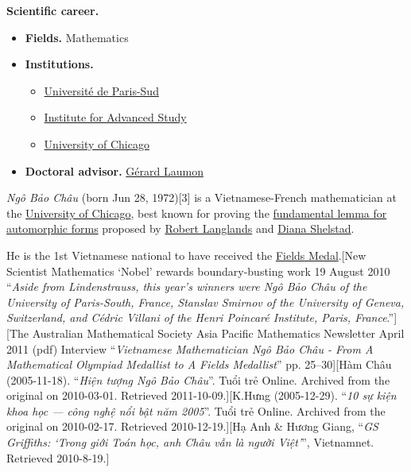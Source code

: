 \documentclass{book}
\numberwithin{equation}{section}
\begin{document}
\textbf{Scientific career.}
\begin{itemize}
    \item \textbf{Fields.} Mathematics
    \item \textbf{Institutions.}
    \begin{itemize}
        \item \href{https://en.wikipedia.org/wiki/Universit%C3%A9_de_Paris-Sud}{Universit\'e de Paris-Sud}
        \item \href{https://en.wikipedia.org/wiki/Institute_for_Advanced_Study}{Institute for Advanced Study}
        \item \href{https://en.wikipedia.org/wiki/University_of_Chicago}{University of Chicago}
    \end{itemize}
    \item \textbf{Doctoral advisor.} \href{https://en.wikipedia.org/wiki/G%C3%A9rard_Laumon}{G\'erard Laumon}
\end{itemize}
\textit{Ngô Bảo Châu} (born Jun 28, 1972)[3] is a Vietnamese-French mathematician at the \href{https://en.wikipedia.org/wiki/University_of_Chicago}{University of Chicago}, best known for proving the \href{https://en.wikipedia.org/wiki/Fundamental_lemma_(Langlands_program)}{fundamental lemma for automorphic forms} proposed by \href{https://en.wikipedia.org/wiki/Robert_Langlands}{Robert Langlands} and \href{https://en.wikipedia.org/wiki/Diana_Shelstad}{Diana Shelstad}.

He is the 1st Vietnamese national to have received the \href{https://en.wikipedia.org/wiki/Fields_Medal}{Fields Medal}.[New Scientist Mathematics `Nobel' rewards boundary-busting work 19 August 2010 ``\textit{Aside from Lindenstrauss, this year's winners were Ngô Bảo Châu of the University of Paris-South, France, Stanslav Smirnov of the University of Geneva, Switzerland, and Cédric Villani of the Henri Poincaré Institute, Paris, France}.''][The Australian Mathematical Society Asia Pacific Mathematics Newsletter April 2011 (pdf) Interview ``\textit{Vietnamese Mathematician Ngô Bảo Châu - From A Mathematical Olympiad Medallist to A Fields Medallist}'' pp. 25--30][Hàm Châu (2005-11-18). ``\textit{Hiện tượng Ngô Bảo Châu}''. Tuổi trẻ Online. Archived from the original on 2010-03-01. Retrieved 2011-10-09.][K.Hưng (2005-12-29). ``\textit{10 sự kiện khoa học — công nghệ nổi bật năm 2005}''. Tuổi trẻ Online. Archived from the original on 2010-02-17. Retrieved 2010-12-19.][Hạ Anh \& Hương Giang, ``\textit{GS Griffiths: `Trong giới Toán học, anh Châu vẫn là người Việt'}'', Vietnamnet. Retrieved 2010-8-19.]
\end{document}
